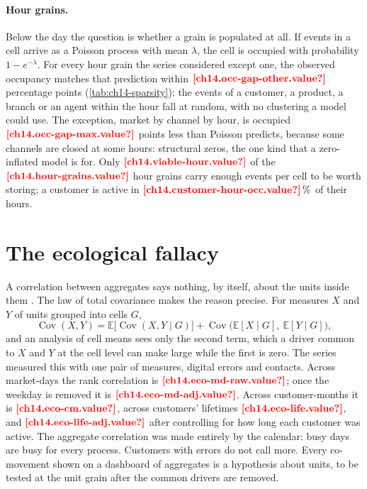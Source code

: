\paragraph{Hour grains.} Below the day the question is whether a grain is populated at all. If events in a cell arrive as
a Poisson process with mean $\lambda$, the cell is occupied with probability $1 - e^{-\lambda}$. For every hour grain the
series considered except one, the observed occupancy matches that prediction within
$\est{ch14.occ-gap-other}{value}$ percentage points (\cref{tab:ch14-sparsity}): the events of a customer, a product, a branch
or an agent within the hour fall at random, with no clustering a model could use. The exception, market by channel by
hour, is occupied $\est{ch14.occ-gap-max}{value}$ points less than Poisson predicts, because some channels are closed at
some hours: structural zeros, the one kind that a zero-inflated model is for. Only $\est{ch14.viable-hour}{value}$ of the
$\est{ch14.hour-grains}{value}$ hour grains carry enough events per cell to be worth storing; a customer is active in
$\est{ch14.customer-hour-occ}{value}\,\%$ of their hours.



\section{The ecological fallacy}\label{sec:ag2-ecological}

A correlation between aggregates says nothing, by itself, about the units inside them \autocite{robinson1950}. The law of
total covariance makes the reason precise. For measures $X$ and $Y$ of units grouped into cells $G$,
\begin{equation}\label{eq:ag2-covariance}
  \operatorname{Cov}(X, Y) = \mathbb{E}\bigl[\operatorname{Cov}(X, Y \mid G)\bigr]
  + \operatorname{Cov}\bigl(\mathbb{E}[X \mid G],\ \mathbb{E}[Y \mid G]\bigr),
\end{equation}
and an analysis of cell means sees only the second term, which a driver common to $X$ and $Y$ at the cell level can make
large while the first is zero. The series measured this with one pair of measures, digital errors and contacts. Across
market-days the rank correlation is $\est{ch14.eco-md-raw}{value}$; once the weekday is removed it is
$\est{ch14.eco-md-adj}{value}$. Across customer-months it is $\est{ch14.eco-cm}{value}$, across customers' lifetimes
$\est{ch14.eco-life}{value}$, and $\est{ch14.eco-life-adj}{value}$ after controlling for how long each customer was active.
The aggregate correlation was made entirely by the calendar: busy days are busy for every process. Customers with errors do
not call more. Every co-movement shown on a dashboard of aggregates is a hypothesis about units, to be tested at the unit
grain after the common drivers are removed.

